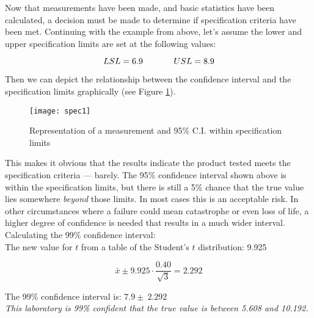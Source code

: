 Now that measurements have been made, and basic statistics have been calculated, a decision must be made to determine if specification criteria have been met.  Continuing with the example from above, let's assume the lower and  upper specification limits are set at the following values:

\begin{center}
\begin{equation}
LSL = 6.9  \hspace{0.5in}  USL = 8.9 
\end{equation}

\end{center}

Then we can depict the relationship between the confidence interval and the specification limits graphically (see Figure \ref{fig2}).
\begin{figure}[h]\caption{Representation of a measurement and 95\% C.I. within specification limits}\label{fig2}
\begin{center}
\texttt{[image: spec1]}
\end{center}
\end{figure}

This makes it obvious that the results indicate the product tested meets the specification criteria --- barely.  The 95\% confidence interval shown above is within the specification limits, but there is still a 5\% chance that the true value lies somewhere \textit{beyond} those limits.  In most cases this is an acceptable risk. In other circumstances where a failure could mean catastrophe or even loss of life, a higher degree of confidence is needed that results in a much wider interval.\\


Calculating the 99\% confidence interval:\\


The new value for $ t $  from a table of the Student’s $ t $ distribution: 9.925\\

\begin{center}
\begin{equation}
\bar{x} \pm 9.925 \cdot \frac{0.40}{\sqrt{3}}  = 2.292 
\end{equation}
\end{center}

The 99\% confidence interval is: $ 7.9 \pm \ 2.292 $\\


\textit{This laboratory is 99\% confident that the true value is between 5.608 and 10.192.}\\

